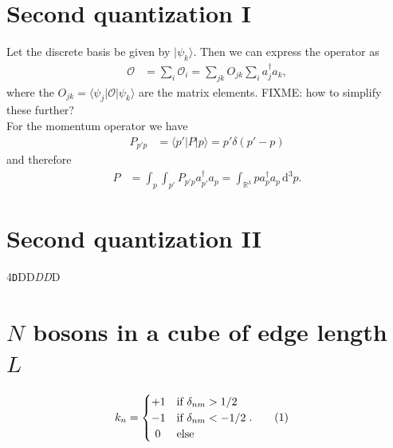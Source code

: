 \documentclass[english, parskip=full]{scrartcl}
\newcommand\numberthis{\addtocounter{equation}{1}\tag{\theequation}}
\newcommand{\braket}{}
\newcommand{\intr}{}
\newcommand{\tecxt}{}
\newcommand{\Ket}{}
\begin{document}
\section{Second quantization I}
Let the discrete basis be given by $\Ket | {\psi_k} \rangle$.
Then we can express the operator as
\begin{align*}
\mathcal{O}&=\sum_i\mathcal{O}_i=\sum_{jk}O_{jk}\sum_i a_j^\dagger a_k,
\end{align*}
where the $O_{jk}=\braket\langle {\psi_j} | {\mathcal{O}} | {\psi_k}\rangle$ are the matrix elements. 
FIXME: how to simplify these further?
\\
For the momentum operator we have
\begin{align*}
P_{p'p}&=\braket\langle {p'} | {P} | {p}\rangle=p'\delta (p'-p)
\end{align*}
and therefore
\begin{align*}
P&=\int_{p}\int_{p'}P_{p'p}a_{p'}^\dagger a_p=\intr\int_{\mathbb{R}^{3}}{pa_{p}^\dagger a_p}\,\mathrm{d}^{3}p.
\end{align*}
\section{Second quantization II}
4\texttt{D}\textsc{D}\textsf{D}\textsl{D}\textit{D}D
\section{$N$ bosons in a cube of edge length $L$}
\begin{align*}
k_n&=\begin{cases}
+1&\tecxt\text{if}\ \delta_{nm}>1/2 \\
-1&\tecxt\text{if}\ \delta_{nm}<-1/2 \\
\ 0 &\tecxt\text{else}
\end{cases} .\numberthis\label{eqn:RulesForKN}
\end{align*}
\end{document}
